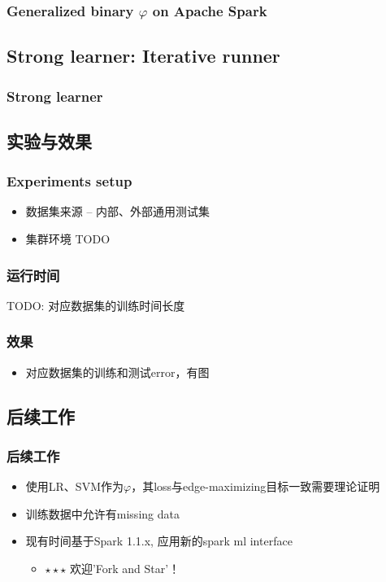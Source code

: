 \documentclass{beamer}
\begin{document}
\begin{frame}
\frametitle{Generalized binary $\varphi$ on Apache Spark}
\end{frame}


\subsection{Strong learner: Iterative runner}

\begin{frame}
\frametitle{Strong learner}

\end{frame}


\subsection{实验与效果}

\begin{frame}
\frametitle{Experiments setup}
\begin{itemize}
\item 数据集来源 -- 内部、外部通用测试集
\item 集群环境 TODO
\end{itemize}
\end{frame}

\begin{frame}
\frametitle{运行时间}
TODO: 对应数据集的训练时间长度
\end{frame}

\begin{frame}
\frametitle{效果}
\begin{itemize}
\item 对应数据集的训练和测试error，有图
\end{itemize}
\end{frame}


\subsection{后续工作}

\begin{frame}
\frametitle{后续工作}
\begin{itemize}
\item 使用LR、SVM作为$\varphi$，其loss与edge-maximizing目标一致需要理论证明
\item 训练数据中允许有missing data
\item 现有时间基于Spark 1.1.x, 应用新的spark ml interface
  \begin{itemize}
    \item $\star \star \star$ 欢迎'Fork and Star'！
  \end{itemize}
\end{itemize}
\end{frame}
\end{document}
